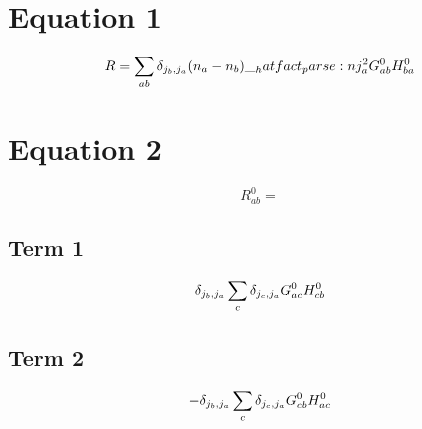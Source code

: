 \documentclass{scrartcl}
\begin{document}
\section{Equation 1}
\begin{dmath*}
R = \sum_{a b} \* \delta_{{j}_{b},{j}_{a}} \* (n_{a} -n_{b}) \* \hatfact{{j}_{a}^{2}} \* G_{a b}^{0} \* H_{b a}^{0}
\end{dmath*}

\section{Equation 2}
\begin{dmath*}
R_{a b}^{0} = 
\end{dmath*}
\subsection{Term 1}
\begin{dmath*}
\delta_{{j}_{b},{j}_{a}} \* \sum_{c} \* \delta_{{j}_{c},{j}_{a}} \* G_{a c}^{0} \* H_{c b}^{0}
\end{dmath*}
\subsection{Term 2}
\begin{dmath*}
-\delta_{{j}_{b},{j}_{a}} \* \sum_{c} \* \delta_{{j}_{c},{j}_{a}} \* G_{c b}^{0} \* H_{a c}^{0}
\end{dmath*}
\end{document}
